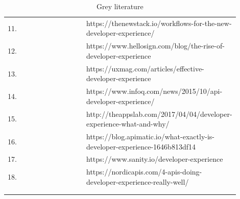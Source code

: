 \documentclass[english, 12pt, a4paper, sci, utf8, a-1b, online]{aaltothesis}
\begin{document}
\begin{center}
\begin{longtable}{p{0.05\linewidth}p{0.35\linewidth}p{0.5\linewidth}}
    11. & \textcite{workflows-for-the-new-developer-experience}           & https://thenewstack.io/workflows-for-the-new-developer-experience/                                                       \\
    12. & \textcite{apis-for-humans-the-rise-of-developer-experience}     & https://www.hellosign.com/blog/the-rise-of-developer-experience                                                          \\
    13. & \textcite{effective-developer-experience}                       & https://uxmag.com/articles/effective-developer-experience                                                                \\
    14. & \textcite{what-is-api-developer-experience-and-why-it-matters}  & https://www.infoq.com/news/2015/10/api-developer-experience/                                                             \\
    15. & \textcite{developer-experience-what-and-why}                    & http://theappslab.com/2017/04/04/developer-experience-what-and-why/                                                      \\
    16. & \textcite{what-exactly-is-developer-experience}                 & https://blog.apimatic.io/what-exactly-is-developer-experience-1646b813df14                                               \\
    17. & \textcite{developer-experience-sanity}                          & https://www.sanity.io/developer-experience                                                                               \\
    18. & \textcite{4-apis-doing-developer-experience-really-well}        & https://nordicapis.com/4-apis-doing-developer-experience-really-well/                                                    \\
    \captionsetup{width=0.6\textwidth}                                                                                                                                                               \\
    \caption{Grey literature}                                                                                                                                                                        \\
  \end{longtable}
\end{center}
\end{document}
